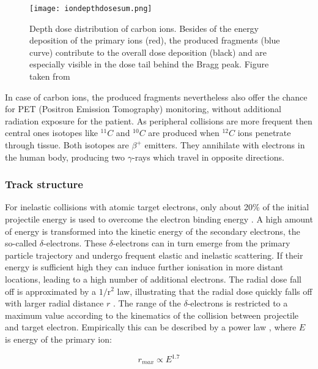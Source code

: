 \documentclass[type=dr, dr=rernat, accentcolor=tud7b,colorbacktitle, bigchapter, openright, twoside, 12pt ]{tudthesis}
\begin{document}
\begin{figure}[H]
\begin{center}
\texttt{[image: iondepthdosesum.png]}
\caption{Depth dose distribution of carbon ions. Besides of the energy deposition of the primary ions (red), the produced fragments 
(blue curve) contribute to the overall dose deposition (black) and are especially visible in the dose tail behind the Bragg 
peak. Figure taken from \cite{Gro04}}
\end{center}
\end{figure}

In case of carbon ions, the produced fragments nevertheless also offer the chance for PET (Positron Emission Tomography) monitoring, 
without additional radiation exposure for the patient. As peripheral collisions are more frequent then central ones \cite{Kra00} 
isotopes like $^{11}C$ and $^{10}C$ are produced when $^{12}C$ ions penetrate through tissue. Both isotopes are $\beta^{+}$ 
emitters. They annihilate with electrons in the human body, producing two $\gamma$-rays which travel in opposite directions.


\subsubsection{Track structure}

For inelastic collisions with atomic target electrons, only about 20\% of the initial projectile energy is used to overcome the 
electron binding energy \cite{Kra92}. A high amount of energy is transformed into the kinetic energy of the secondary electrons, the 
so-called $\delta$-electrons. These $\delta$-electrons can in turn emerge from the primary particle trajectory and undergo frequent 
elastic and inelastic scattering. If their energy is sufficient high they can induce further ionisation in more distant locations, 
leading to a high number of additional electrons. The radial dose fall off is approximated by a $\mathrm{1}/\mathrm{r^{2}}$ law, 
illustrating that the radial dose quickly falls off with larger radial distance $r$ \cite{Cha76} \cite{Kat99} \cite{Ric12}. 
The range of the $\delta$-electrons is restricted to a maximum value according to the kinematics of the collision between projectile 
and target electron. Empirically this can be described by a power law \cite{Kie86}, where $E$ is energy of the primary ion:

\begin{equation}
 r_{max} \propto E^{1.7}
\end{equation}
\end{document}
